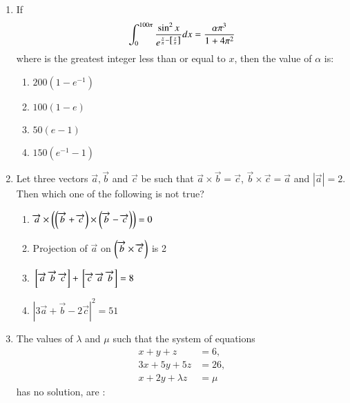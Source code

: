 \documentclass[journal]{IEEEtran}
\begin{document}
\begin{enumerate}
{\begin{multicols}{4}
\begin{enumerate}
\item $-38$
\end{enumerate}
\end{multicols}
}
\item{
If  $$\int_0^{100\pi} \frac{\sin^2 x}{e^{\frac{x}{\pi} - {}\left[\frac{x}{\pi}\right]}} dx = \frac{\alpha \pi^3}{1+ 4\pi^2}$$
where  is the greatest integer less than or equal to $x$, then the value of $\alpha$ is:
\begin{multicols}{4}
\begin{enumerate}
\item $200(1 - e ^{-1})$
\item $100(1 - e)$
\item $50(e - 1)$
\item $150(e^{-1} - 1)$
\end{enumerate}
\end{multicols}
}
\item{
Let three vectors $\overrightarrow{a},\overrightarrow{b}$ and $\overrightarrow{c}$ be such that $\overrightarrow{a} \times \overrightarrow{b} = \overrightarrow{c}$, $\overrightarrow{b} \times \overrightarrow{c} =\overrightarrow{a}$ and $|\overrightarrow{a}| = 2$. Then which one of the following is not true?
\begin{multicols}{2}
\begin{enumerate}
\item $\overrightarrow{a}\times\left(\left(\overrightarrow{b}+\overrightarrow{c}\right)\times\left(\overrightarrow{b}-\overrightarrow{c}\right)\right) = 0$
\item Projection of $\overrightarrow{a}$ on $\left(\overrightarrow{b}\times\overrightarrow{c}\right)$ is 2
\item ${}\left[\overrightarrow{a}\text{ }\overrightarrow{b}\text{ }\overrightarrow{c}\right]+{}\left[\overrightarrow{c}\text{ }\overrightarrow{a}\text{ }\overrightarrow{b}\right] =8$
\item $|3\overrightarrow{a}+\overrightarrow{b}  -2\overrightarrow{c}|^2 = 51$
\end{enumerate}
\end{multicols}
}
\item{
The values of $\lambda$ and $\mu$ such that the system of equations 
\begin{align*}
x+y+z &= 6, \\
3x+5y+5z &= 26, \\
x + 2y + \lambda z &= \mu
\end{align*}
has no solution, are : 
\begin{multicols}{4}
\begin{enumerate}

\end{enumerate}
\end{multicols}}
\end{enumerate}
\end{document}
